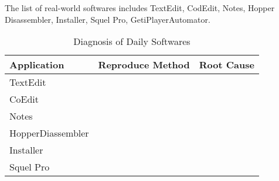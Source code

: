 The list of real-world softwares includes TextEdit, CodEdit, Notes, Hopper Disassembler, Installer, Squel Pro, GetiPlayerAutomator.
\begin{table}[h]
\begin{tabular}{|l|c|c|}
Application & Reproduce Method & Root Cause\\
\hline
TextEdit & & \\
CoEdit & & \\
Notes & & \\
HopperDiassembler & & \\
Installer & &\\
Squel Pro & & \\
\end{tabular}
\caption{Diagnosis of Daily Softwares}
\label{tab:disagnosis of daily softwares}
\end{table}


